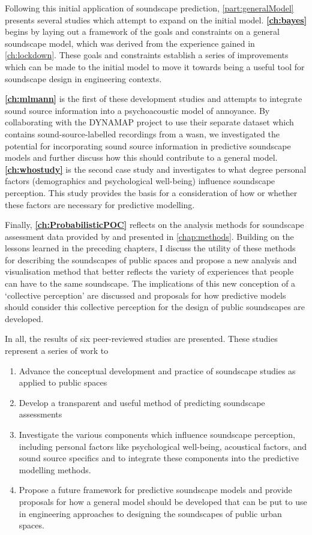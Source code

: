 Following this initial application of soundscape prediction, \cref{part:generalModel} presents several studies which attempt to expand on the initial model. \textbf{\cref{ch:bayes}} begins by laying out a framework of the goals and constraints on a general soundscape model, which was derived from the experience gained in \cref{ch:lockdown}. These goals and constraints establish a series of improvements which can be made to the initial model to move it towards being a useful tool for soundscape design in engineering contexts. 

\textbf{\cref{ch:mlmann}} is the first of these development studies and attempts to integrate sound source information into a psychoacoustic model of annoyance. By collaborating with the DYNAMAP project to use their separate dataset which contains sound-source-labelled recordings from a \gls{wasn}, we investigated the potential for incorporating sound source information in predictive soundscape models and further discuss how this should contribute to a general model. \textbf{\cref{ch:whostudy}} is the second case study and investigates to what degree personal factors (demographics and psychological well-being) influence soundscape perception. This study provides the basis for a consideration of how or whether these factors are necessary for predictive modelling.

Finally, \textbf{\cref{ch:ProbabilisticPOC}} reflects on the analysis methods for soundscape assessment data provided by \citet{ISO12913Part2} and presented in \cref{chap:methods}. Building on the lessons learned in the preceding chapters, I discuss the utility of these methods for describing the soundscapes of public spaces and propose a new analysis and visualisation method that better reflects the variety of experiences that people can have to the same soundscape. The implications of this new conception of a `collective perception' are discussed and proposals for how predictive models should consider this collective perception for the design of public soundscapes are developed.

In all, the results of six peer-reviewed studies are presented. These studies represent a series of work to

\begin{enumerate}
  \item Advance the conceptual development and practice of soundscape studies as applied to public spaces
  \item Develop a transparent and useful method of predicting soundscape assessments
  \item Investigate the various components which influence soundscape perception, including personal factors like psychological well-being, acoustical factors, and sound source specifics and to integrate these components into the predictive modelling methods.
  \item Propose a future framework for predictive soundscape models and provide proposals for how a general model should be developed that can be put to use in engineering approaches to designing the soundscapes of public urban spaces. 
\end{enumerate}

